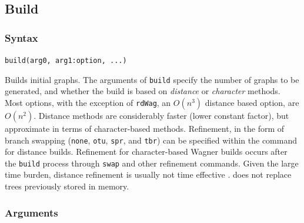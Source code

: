 \subsection{Build}
	\subsubsection{Syntax}
		\texttt{build(arg0, arg1:option, ...)}\\
	
	\begin{phygdescription}
		{Builds initial graphs. The arguments of \texttt{build} specify the number of graphs 
		to be generated, and whether the build is based on \textit{distance} or \textit{character} 
		methods. Most options, with the exception of \texttt{rdWag}, an $O(n^3)$ distance based 
		option, are $O(n^2)$. Distance methods are considerably faster (lower constant 
		factor), but approximate in terms of character-based methods. Refinement, in the form 
		of branch swapping (\texttt{none}, \texttt{otu}, \texttt{spr}, and \texttt{tbr}) can be 
		specified within the command for distance builds. Refinement for character-based 
		Wagner builds occurs after the \texttt{build} process through \texttt{swap} and other
		refinement commands. Given the large time burden, distance refinement is usually 
		not time effective \citep{Wheeler2021}. \phyg does not replace trees previously 
		stored in memory.}
	\end{phygdescription}
		
	\subsubsection{Arguments}

